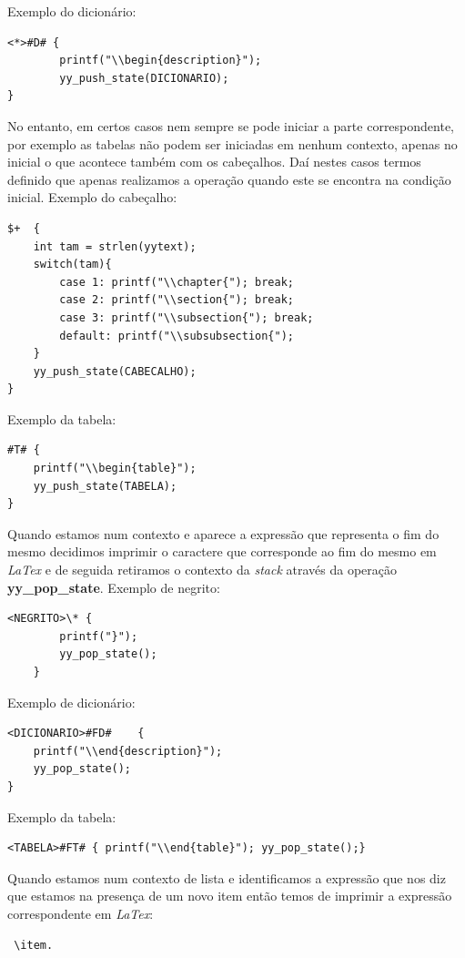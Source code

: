 \documentclass{article}
\begin{document}
Exemplo do dicionário:
\begin{verbatim}
<*>#D# {
        printf("\\begin{description}");
        yy_push_state(DICIONARIO);
}
\end{verbatim}
No entanto, em certos casos nem sempre se pode iniciar a parte correspondente, por exemplo as tabelas não podem ser iniciadas em nenhum contexto, apenas no inicial o que acontece também com os cabeçalhos. Daí nestes casos termos definido que apenas realizamos a operação quando este se encontra na condição inicial.
Exemplo do cabeçalho:
\begin{verbatim}
$+  {
    int tam = strlen(yytext);
    switch(tam){
        case 1: printf("\\chapter{"); break;
        case 2: printf("\\section{"); break;
        case 3: printf("\\subsection{"); break;
        default: printf("\\subsubsection{");
    }
    yy_push_state(CABECALHO);
}
\end{verbatim}
Exemplo da tabela:
\begin{verbatim}
#T# {
    printf("\\begin{table}");
    yy_push_state(TABELA);
}
\end{verbatim}
Quando estamos num contexto e aparece a expressão que representa o fim do mesmo decidimos imprimir o caractere que corresponde ao fim do mesmo em \textit{LaTex} e de seguida retiramos o contexto da \textit{stack} através da operação \textbf{yy\_pop\_state}.
Exemplo de negrito:
\begin{verbatim}
<NEGRITO>\* {
        printf("}");
        yy_pop_state();
    }
\end{verbatim}
Exemplo de dicionário:
\begin{verbatim}
<DICIONARIO>#FD#    {
    printf("\\end{description}");
    yy_pop_state();
}
\end{verbatim}
Exemplo da tabela:
\begin{verbatim}
<TABELA>#FT# { printf("\\end{table}"); yy_pop_state();}
\end{verbatim}
Quando estamos num contexto de lista e identificamos a expressão que nos diz que estamos na presença de um novo item então temos de imprimir a expressão correspondente em \textit{LaTex}: \begin{verbatim} \item. \end{verbatim}
\end{document}
